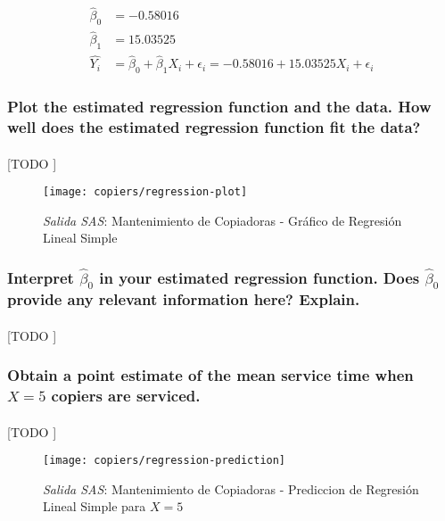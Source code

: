 \documentclass{article}
\begin{document}
        \begin{align}
          \widehat{\beta}_0 &= -0.58016\\
          \widehat{\beta}_1 &= 15.03525\\
          \widehat{Y_i} &= \widehat{\beta}_0 +\widehat{\beta}_1X_i + \epsilon_i = -0.58016 + 15.03525 X_i + \epsilon_i
        \end{align}

      \subsubsection{Plot the estimated regression function and the data. How well does the estimated regression function fit the data?}

        \paragraph{}
        [TODO ]

        \begin{figure}[!h]
          \centering
          \texttt{[image: copiers/regression-plot]}
          \caption{\emph{Salida SAS}: Mantenimiento de Copiadoras - Gráfico de Regresión Lineal Simple}
          \label{img:copiers-regression-plot}
        \end{figure}

      \subsubsection{Interpret $\widehat{\beta}_0$ in your estimated regression function. Does $\widehat{\beta}_0$ provide any relevant information here? Explain.}

        \paragraph{}
        [TODO ]


      \subsubsection{Obtain a point estimate of the mean service time when $X = 5$ copiers are serviced.}

        \paragraph{}
        [TODO ]

        \begin{figure}[!h]
          \centering
          \texttt{[image: copiers/regression-prediction]}
          \caption{\emph{Salida SAS}: Mantenimiento de Copiadoras - Prediccion de Regresión Lineal Simple para $X = 5$}
          \label{img:copiers-regression-prediction}
        \end{figure}
\end{document}

